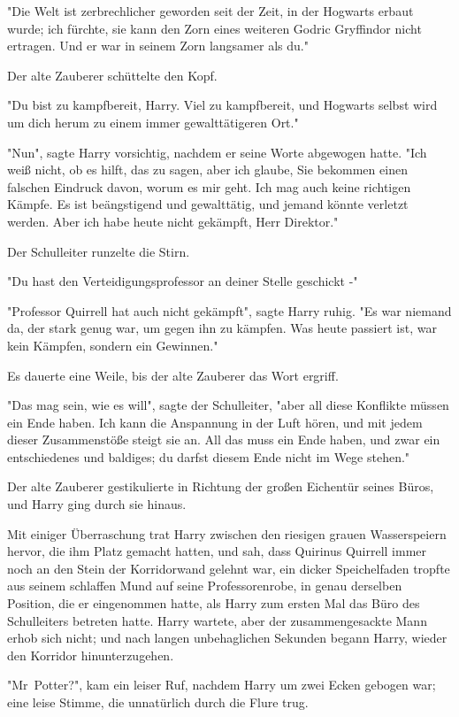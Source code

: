 {"Die Welt ist zerbrechlicher geworden seit der Zeit, in der Hogwarts erbaut wurde; ich fürchte, sie kann den Zorn eines weiteren Godric Gryffindor nicht ertragen. Und er war in seinem Zorn langsamer als du."

Der alte Zauberer schüttelte den Kopf.

"Du bist zu kampfbereit, Harry. Viel zu kampfbereit, und Hogwarts selbst wird um dich herum zu einem immer gewalttätigeren Ort."

"Nun", sagte Harry vorsichtig, nachdem er seine Worte abgewogen hatte. "Ich weiß nicht, ob es hilft, das zu sagen, aber ich glaube, Sie bekommen einen falschen Eindruck davon, worum es mir geht. Ich mag auch keine richtigen Kämpfe. Es ist beängstigend und gewalttätig, und jemand könnte verletzt werden. Aber ich habe heute nicht gekämpft, Herr Direktor."

Der Schulleiter runzelte die Stirn.

"Du hast den Verteidigungsprofessor an deiner Stelle geschickt -"

"Professor Quirrell hat auch nicht gekämpft", sagte Harry ruhig. "Es war niemand da, der stark genug war, um gegen ihn zu kämpfen. Was heute passiert ist, war kein Kämpfen, sondern ein Gewinnen."

Es dauerte eine Weile, bis der alte Zauberer das Wort ergriff.

"Das mag sein, wie es will", sagte der Schulleiter, "aber all diese Konflikte müssen ein Ende haben. Ich kann die Anspannung in der Luft hören, und mit jedem dieser Zusammenstöße steigt sie an. All das muss ein Ende haben, und zwar ein entschiedenes und baldiges; du darfst diesem Ende nicht im Wege stehen."

Der alte Zauberer gestikulierte in Richtung der großen Eichentür seines Büros, und Harry ging durch sie hinaus.

Mit einiger Überraschung trat Harry zwischen den riesigen grauen Wasserspeiern hervor, die ihm Platz gemacht hatten, und sah, dass Quirinus Quirrell immer noch an den Stein der Korridorwand gelehnt war, ein dicker Speichelfaden tropfte aus seinem schlaffen Mund auf seine Professorenrobe, in genau derselben Position, die er eingenommen hatte, als Harry zum ersten Mal das Büro des Schulleiters betreten hatte. Harry wartete, aber der zusammengesackte Mann erhob sich nicht; und nach langen unbehaglichen Sekunden begann Harry, wieder den Korridor hinunterzugehen.

"Mr~Potter?", kam ein leiser Ruf, nachdem Harry um zwei Ecken gebogen war; eine leise Stimme, die unnatürlich durch die Flure trug.

}
